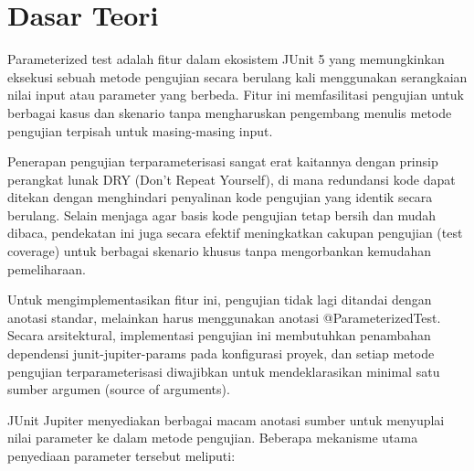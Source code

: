 \documentclass[a4paper,12pt]{article}
\begin{document}
\section{Dasar Teori}
Parameterized test adalah fitur dalam ekosistem JUnit 5 yang memungkinkan eksekusi sebuah metode pengujian secara berulang kali menggunakan serangkaian nilai input atau parameter yang berbeda. Fitur ini memfasilitasi pengujian untuk berbagai kasus dan skenario tanpa mengharuskan pengembang menulis metode pengujian terpisah untuk masing-masing input.

Penerapan pengujian terparameterisasi sangat erat kaitannya dengan prinsip perangkat lunak DRY (Don't Repeat Yourself), di mana redundansi kode dapat ditekan dengan menghindari penyalinan kode pengujian yang identik secara berulang. Selain menjaga agar basis kode pengujian tetap bersih dan mudah dibaca, pendekatan ini juga secara efektif meningkatkan cakupan pengujian (test coverage) untuk berbagai skenario khusus tanpa mengorbankan kemudahan pemeliharaan.

Untuk mengimplementasikan fitur ini, pengujian tidak lagi ditandai dengan anotasi standar, melainkan harus menggunakan anotasi @ParameterizedTest. Secara arsitektural, implementasi pengujian ini membutuhkan penambahan dependensi junit-jupiter-params pada konfigurasi proyek, dan setiap metode pengujian terparameterisasi diwajibkan untuk mendeklarasikan minimal satu sumber argumen (source of arguments).

JUnit Jupiter menyediakan berbagai macam anotasi sumber untuk menyuplai nilai parameter ke dalam metode pengujian. Beberapa mekanisme utama penyediaan parameter tersebut meliputi:
\end{document}
